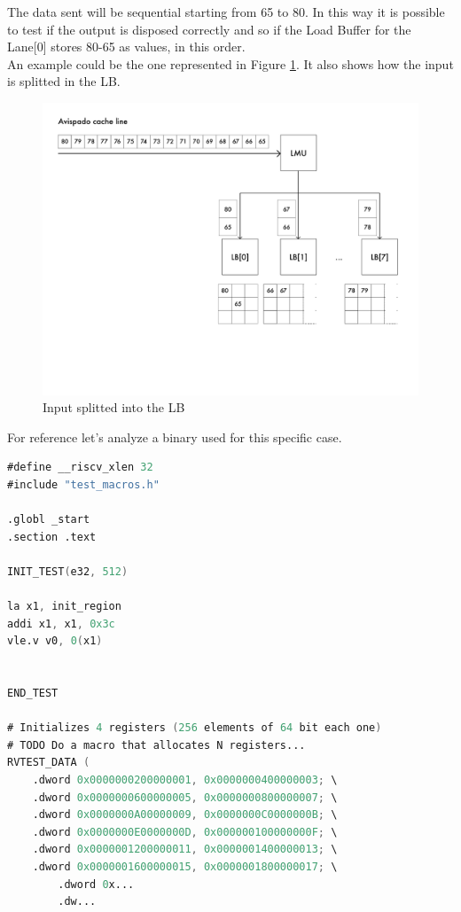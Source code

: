 The data sent will be sequential starting from 65 to 80. In this way it is possible to test if the output is disposed correctly and so if the Load Buffer for the Lane[0] stores 80-65 as values, in this order.\\

An example could be the one represented in Figure \ref{cache-to-lb-split-ex}. It also shows how the input is splitted in the LB.

\begin{figure}[H]
    \centering
    \includegraphics[scale = 0.6]{Chapter_2/img/cache-to-lb-split-ex.png}
    \caption{Input splitted into the LB}
    \label{cache-to-lb-split-ex}
\end{figure}

For reference let's analyze a binary used for this specific case.
\newpage

\linespread{1}
\begin{lstlisting}[language=Verilog,style=verilog-style, backgroundcolor=\color{lyel_palette}, frame=tl]
#define __riscv_xlen 32
#include "test_macros.h"

.globl _start
.section .text

INIT_TEST(e32, 512)

la x1, init_region
addi x1, x1, 0x3c
vle.v v0, 0(x1)


END_TEST

# Initializes 4 registers (256 elements of 64 bit each one)
# TODO Do a macro that allocates N registers...
RVTEST_DATA (
	.dword 0x0000000200000001, 0x0000000400000003; \
	.dword 0x0000000600000005, 0x0000000800000007; \
	.dword 0x0000000A00000009, 0x0000000C0000000B; \
	.dword 0x0000000E0000000D, 0x000000100000000F; \
	.dword 0x0000001200000011, 0x0000001400000013; \
	.dword 0x0000001600000015, 0x0000001800000017; \
        .dword 0x...
        .dw...  

     
 

        
\end{lstlisting}
\linespread{1.2}

